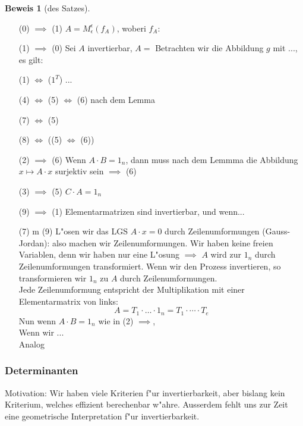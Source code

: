 \documentclass[11pt]{article}
\theoremstyle{remark}
\theoremstyle{definition}
\newtheorem{prof}{Beweis}
\theoremstyle{remark}
\begin{document}
\begin{prof}[des Satzes]
  \begin{itemize}
  \item[(0) $\implies$ (1)]  $A=M^{\epsilon}_{\epsilon}(f_A)$, woberi $f_A:$
  \item[(1) $\implies$ (0)] Sei $A$ invertierbar, $A=$ Betrachten wir die
    Abbildung $g$ mit ..., es gilt: 
  \item[(1) $\iff$ ($1^T$)] ...
  \item[(4) $ \iff $ (5) $ \iff $ (6)] nach dem Lemma
  \item[(7) $ \iff $ (5)]
  \item[(8) $ \iff $ ((5) $ \iff $ (6))]
  \item[(2) $ \implies $ (6)] Wenn $A\cdot B=1_n$, dann muss nach dem Lemmma die
    Abbildung $x\mapsto A\cdot x$ surjektiv sein $\implies$ (6)
  \item[(3) $ \implies $ (5)] $C\cdot A = 1_n$
  \item[(9) $ \implies $ (1)] Elementarmatrizen sind invertierbar, und wenn...
  \item[(7) m (9)] L"osen wir das LGS $A\cdot x = 0$ durch
    Zeilenumformungen (Gauss-Jordan): also machen wir Zeilenumformungen. Wir
    haben keine freien Variablen, denn wir haben nur eine L"osung $\implies$
    $A$ wird zur $1_n$ durch Zeilenumformungen transformiert. Wenn wir den
    Prozess invertieren, so transformieren wir $1_n$ zu $A$ durch
    Zeilenumformungen. \\
    Jede Zeilenumformung entspricht der Multiplikation mit einer
    Elementarmatrix von links: \[A=T_1 \cdot \dots \cdot 1_n = T_1 \cdot \cdots
      \cdot T_e\]
    Nun wenn $A\cdot B = 1_n$ wie in (2) $\implies$, \\
    Wenn wir ... \\
    Analog
  \end{itemize}
\end{prof}

\subsubsection{Determinanten}
\label{sec:det}

Motivation: Wir haben viele Kriterien f"ur invertierbarkeit, aber bislang kein
Kriterium, welches effizient berechenbar w"ahre. Ausserdem fehlt uns zur Zeit
eine geometrische Interpretation f"ur invertierbarkeit.
\end{document}
